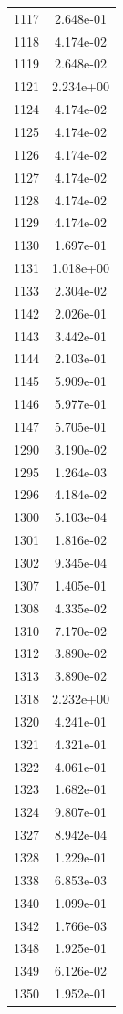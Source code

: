 \documentclass[12pt]{article}
\begin{document}
\begin{longtable}{@{}cc@{}}
1117 & 2.648e-01 \\
1118 & 4.174e-02 \\
1119 & 2.648e-02 \\
1121 & 2.234e+00 \\
1124 & 4.174e-02 \\
1125 & 4.174e-02 \\
1126 & 4.174e-02 \\
1127 & 4.174e-02 \\
1128 & 4.174e-02 \\
1129 & 4.174e-02 \\
1130 & 1.697e-01 \\
1131 & 1.018e+00 \\
1133 & 2.304e-02 \\
1142 & 2.026e-01 \\
1143 & 3.442e-01 \\
1144 & 2.103e-01 \\
1145 & 5.909e-01 \\
1146 & 5.977e-01 \\
1147 & 5.705e-01 \\
1290 & 3.190e-02 \\
1295 & 1.264e-03 \\
1296 & 4.184e-02 \\
1300 & 5.103e-04 \\
1301 & 1.816e-02 \\
1302 & 9.345e-04 \\
1307 & 1.405e-01 \\
1308 & 4.335e-02 \\
1310 & 7.170e-02 \\
1312 & 3.890e-02 \\
1313 & 3.890e-02 \\
1318 & 2.232e+00 \\
1320 & 4.241e-01 \\
1321 & 4.321e-01 \\
1322 & 4.061e-01 \\
1323 & 1.682e-01 \\
1324 & 9.807e-01 \\
1327 & 8.942e-04 \\
1328 & 1.229e-01 \\
1338 & 6.853e-03 \\
1340 & 1.099e-01 \\
1342 & 1.766e-03 \\
1348 & 1.925e-01 \\
1349 & 6.126e-02 \\
1350 & 1.952e-01 \\

\end{longtable}
\end{document}
